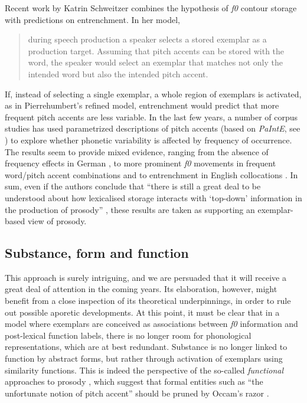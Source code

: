 Recent work by Katrin Schweitzer combines the hypothesis of \textit{f0} contour storage with predictions on entrenchment. In her model, \begin{quote}during speech production a speaker selects a stored exemplar as a production target. Assuming that pitch accents can be stored with the word, the speaker would select an exemplar that matches not only the intended word but also the intended pitch accent. \cite[138]{schweitzer2010frequency}\end{quote}
If, instead of selecting a single exemplar, a whole region of exemplars is activated, as in Pierrehumbert's refined model, entrenchment would predict that more frequent pitch accents are less variable. In the last few years, a number of corpus studies has used parametrized descriptions of pitch accents (based on \textit{PaIntE}, see \citealt{mohler1998parametric,mohler2001improvements}) to explore whether phonetic variability is affected by frequency of occurrence. The results seem to provide mixed evidence, ranging from the absence of frequency effects in German \citep{walsh2008examining}, to more prominent \textit{f0} movements in frequent word/pitch accent combinations \citep{schweitzer2010frequency} and to entrenchment in English collocations \citep{schweitzer2011prosodic}. In sum, even if the authors conclude that ``there is still a great deal to be understood about how lexicalised storage interacts with `top-down' information in the production of prosody'' \cite[4]{schweitzer2011prosodic}, these results are taken as supporting an exemplar-based view of prosody.

\subsection{Substance, form and function}\label{sec632}
This approach is surely intriguing, and we are persuaded that it will receive a great deal of attention in the coming years. Its elaboration, however, might benefit from a close inspection of its theoretical underpinnings, in order to rule out possible aporetic developments. At this point, it must be clear that in a model where exemplars are conceived as associations between \textit{f0} information and post-lexical function labels, there is no longer room for phonological representations, which are at best redundant. Substance is no longer linked to function by abstract forms, but rather through activation of exemplars using similarity functions. This is indeed the perspective of the so-called \textit{functional} approaches to prosody \citep{shriberg1998can,noth2000verbmobil,batliner2001prosodic}, which suggest that formal entities such as ``the unfortunate notion of pitch accent'' should be pruned by Occam's razor \citep[25]{batliner2005prosodic}. 


